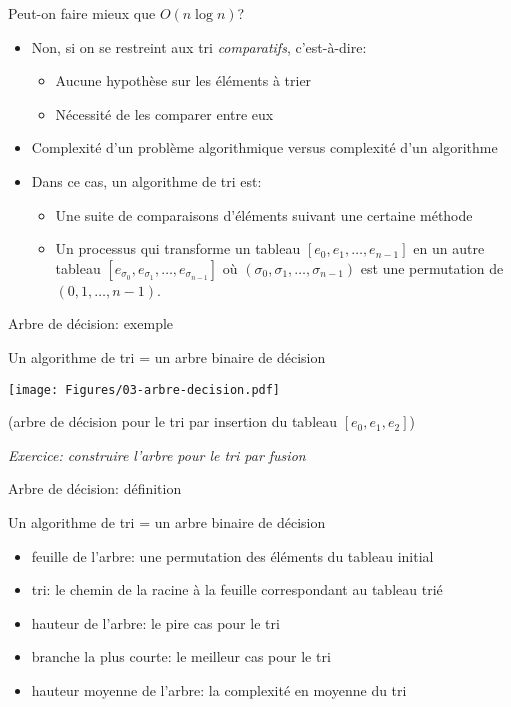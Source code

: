 \begin{frame}{Peut-on faire mieux que $O(n\log n)$?}


\begin{itemize}
\item Non, si on se restreint aux tri \emph{comparatifs}, c'est-à-dire:
\begin{itemize}
\item Aucune hypothèse sur les éléments à trier
\item Nécessité de les comparer entre eux
\end{itemize}
\item Complexité d'un problème algorithmique versus complexité d'un algorithme
\item Dans ce cas, un algorithme de tri est:
\begin{itemize}
\item Une suite de comparaisons d'éléments suivant une certaine méthode
\item Un processus qui transforme un tableau $[e_0,e_1,\ldots,e_{n-1}]$ en un autre tableau $[e_{\sigma_0},e_{\sigma_1},\ldots,e_{\sigma_{n-1}}]$ où $(\sigma_0,\sigma_1,\ldots,\sigma_{n-1})$ est une permutation de $(0,1,\ldots,n-1)$.
\end{itemize}
\end{itemize}

\end{frame}

\begin{frame}{Arbre de décision: exemple}

Un algorithme de tri = un arbre binaire de décision

\bigskip

\centerline{\texttt{[image: Figures/03-arbre-decision.pdf]}}

\bigskip

(arbre de décision pour le tri par insertion du tableau $[e_0,e_1,e_2]$)

\bigskip

\emph{Exercice: construire l'arbre pour le tri par fusion}

\end{frame}

\begin{frame}{Arbre de décision: définition}

Un algorithme de tri = un arbre binaire de décision

\begin{itemize}
\item feuille de l'arbre: une permutation des éléments du tableau initial
\item tri: le chemin de la racine à la feuille correspondant au tableau trié
\item hauteur de l'arbre: le pire cas pour le tri
\item branche la plus courte: le meilleur cas pour le tri
\item hauteur moyenne de l'arbre: la complexité en moyenne du tri
\end{itemize}

\end{frame}

